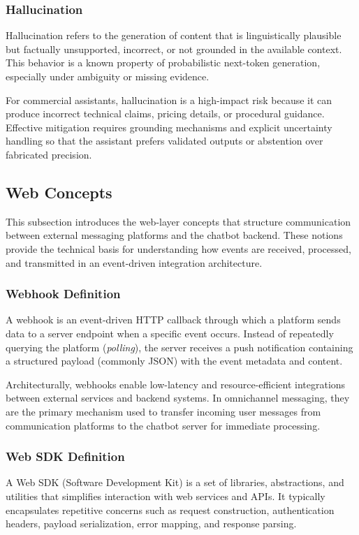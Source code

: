 \subsubsection{Hallucination}
Hallucination refers to the generation of content that is linguistically plausible but factually unsupported, incorrect, or not grounded in the available context. This behavior is a known property of probabilistic next-token generation, especially under ambiguity or missing evidence\cite{ji2023hallucination_survey}.

For commercial assistants, hallucination is a high-impact risk because it can produce incorrect technical claims, pricing details, or procedural guidance. Effective mitigation requires grounding mechanisms and explicit uncertainty handling so that the assistant prefers validated outputs or abstention over fabricated precision.

\subsection{Web Concepts}
This subsection introduces the web-layer concepts that structure communication between external messaging platforms and the chatbot backend. These notions provide the technical basis for understanding how events are received, processed, and transmitted in an event-driven integration architecture.
\subsubsection{Webhook Definition}
A webhook is an event-driven HTTP callback through which a platform sends data to a server endpoint when a specific event occurs\cite{github_webhooks_docs}. Instead of repeatedly querying the platform (\textit{polling}), the server receives a push notification containing a structured payload (commonly JSON) with the event metadata and content\cite{meta_webhooks_docs}.

Architecturally, webhooks enable low-latency and resource-efficient integrations between external services and backend systems. In omnichannel messaging, they are the primary mechanism used to transfer incoming user messages from communication platforms to the chatbot server for immediate processing.
\subsubsection{Web SDK Definition}
A Web SDK (Software Development Kit) is a set of libraries, abstractions, and utilities that simplifies interaction with web services and APIs. It typically encapsulates repetitive concerns such as request construction, authentication headers, payload serialization, error mapping, and response parsing\cite{meta_business_sdk_docs}.

